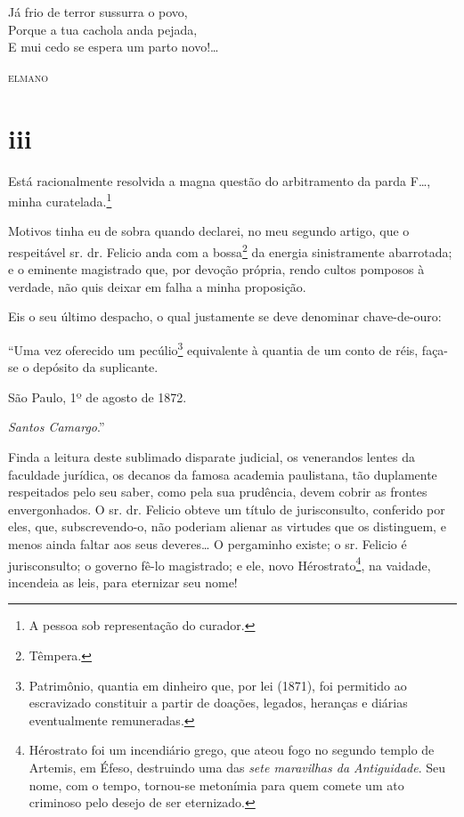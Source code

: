 \epigraph{Já frio de terror sussurra o povo,\\
Porque a tua cachola anda pejada,\footnotemark\\
E mui cedo se espera um parto novo!\ldots{}}{\textsc{elmano}\footnotemark}



\section{iii}

Está racionalmente resolvida a magna questão do arbitramento da parda
F\ldots{}, minha curatelada.\footnote{ A pessoa sob representação do
  curador.}

Motivos tinha eu de sobra quando declarei, no meu segundo artigo, que o
respeitável sr. dr. Felicio anda com a bossa\footnote{ Têmpera.} da
energia sinistramente abarrotada; e o eminente magistrado que, por
devoção própria, rendo cultos pomposos à verdade, não quis deixar em
falha a minha proposição.

Eis o seu último despacho, o qual justamente se deve denominar
chave-de-ouro:

``Uma vez oferecido um pecúlio\footnote{ Patrimônio, quantia em dinheiro
  que, por lei (1871), foi permitido ao escravizado constituir a partir
  de doações, legados, heranças e diárias eventualmente remuneradas.}
equivalente à quantia de um conto de réis, faça-se o depósito da
suplicante.

São Paulo, 1º de agosto de 1872.

\emph{Santos Camargo}.''

Finda a leitura deste sublimado disparate judicial, os venerandos lentes
da faculdade jurídica, os decanos da famosa academia paulistana, tão
duplamente respeitados pelo seu saber, como pela sua prudência, devem
cobrir as frontes envergonhados. O sr. dr. Felicio obteve um título de
jurisconsulto, conferido por eles, que, subscrevendo-o, não poderiam
alienar as virtudes que os distinguem, e menos ainda faltar aos seus
deveres\ldots{} O pergaminho existe; o sr. Felicio é jurisconsulto; o governo
fê-lo magistrado; e ele, novo Hérostrato\footnote{ Hérostrato foi um
  incendiário grego, que ateou fogo no segundo templo de Artemis, em
  Éfeso, destruindo uma das \emph{sete maravilhas da Antiguidade}. Seu
  nome, com o tempo, tornou-se metonímia para quem comete um ato
  criminoso pelo desejo de ser eternizado.}, na vaidade, incendeia as
leis, para eternizar seu nome!


